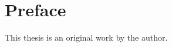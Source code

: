 


\chapter{Preface}

This thesis is an original work by the author. 


\dedication{To the ones who made this a smoother journey.} 


\tableofcontents


\listoftables


\listoffigures

